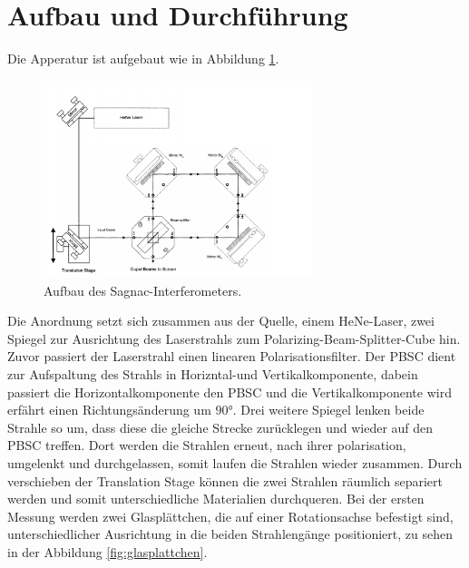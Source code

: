 \section{Aufbau und Durchführung}
\label{sec:Durchführung}
Die  Apperatur ist aufgebaut wie in Abbildung \ref{fig:apparat}.
\begin{figure}
    \centering
    \includegraphics[width=0.7\textwidth]{Apparatur.PNG}
    \caption{Aufbau des Sagnac-Interferometers.\cite{skript}}
    \label{fig:apparat}
\end{figure}
Die Anordnung setzt sich zusammen aus der Quelle, einem HeNe-Laser, zwei
Spiegel zur Ausrichtung des Laserstrahls zum Polarizing-Beam-Splitter-Cube hin.
Zuvor passiert der Laserstrahl einen linearen Polarisationsfilter.
Der PBSC dient zur Aufspaltung des Strahls in Horizntal-und Vertikalkomponente,
dabein passiert die Horizontalkomponente den PBSC und die Vertikalkomponente wird
erfährt einen Richtungsänderung um $90\si{\degree}$. Drei weitere Spiegel lenken
beide Strahle so um, dass diese die gleiche Strecke zurücklegen und wieder auf
den PBSC treffen. Dort werden die Strahlen erneut, nach ihrer polarisation,
umgelenkt und durchgelassen, somit laufen die Strahlen wieder zusammen.
Durch verschieben der Translation Stage können die zwei Strahlen räumlich separiert
werden und somit unterschiedliche Materialien durchqueren.
Bei der ersten Messung werden zwei Glasplättchen, die auf einer Rotationsachse
befestigt sind, unterschiedlicher
Ausrichtung in die beiden Strahlengänge positioniert, zu sehen in der Abbildung
\ref{fig:glasplattchen}.


